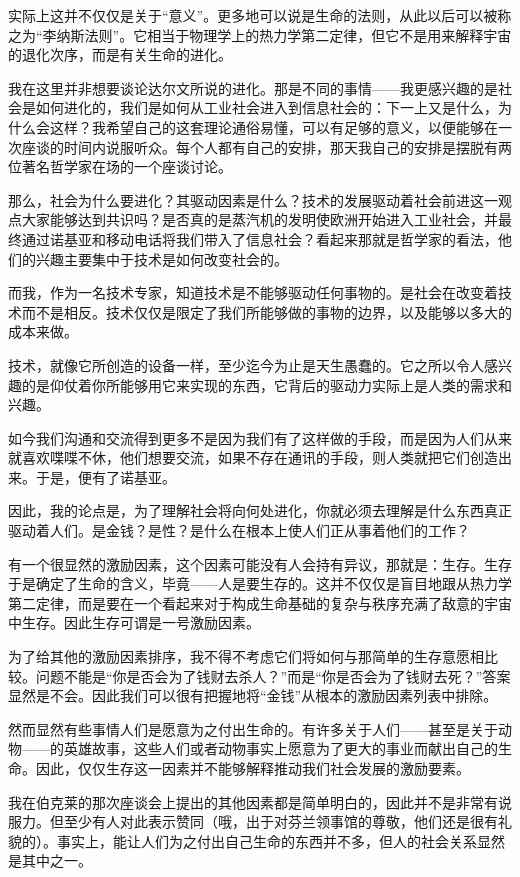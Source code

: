 实际上这并不仅仅是关于“意义”。更多地可以说是生命的法则，从此以后可以被称之为“李纳斯法则”。它相当于物理学上的热力学第二定律，但它不是用来解释宇宙的退化次序，而是有关生命的进化。

我在这里并非想要谈论达尔文所说的进化。那是不同的事情——我更感兴趣的是社会是如何进化的，我们是如何从工业社会进入到信息社会的：下一上又是什么，为什么会这样？我希望自己的这套理论通俗易懂，可以有足够的意义，以便能够在一次座谈的时间内说服听众。每个人都有自己的安排，那天我自己的安排是摆脱有两位著名哲学家在场的一个座谈讨论。

那么，社会为什么要进化？其驱动因素是什么？技术的发展驱动着社会前进这一观点大家能够达到共识吗？是否真的是蒸汽机的发明使欧洲开始进入工业社会，并最终通过诺基亚和移动电话将我们带入了信息社会？看起来那就是哲学家的看法，他们的兴趣主要集中于技术是如何改变社会的。

而我，作为一名技术专家，知道技术是不能够驱动任何事物的。是社会在改变着技术而不是相反。技术仅仅是限定了我们所能够做的事物的边界，以及能够以多大的成本来做。

技术，就像它所创造的设备一样，至少迄今为止是天生愚蠢的。它之所以令人感兴趣的是仰仗着你所能够用它来实现的东西，它背后的驱动力实际上是人类的需求和兴趣。

如今我们沟通和交流得到更多不是因为我们有了这样做的手段，而是因为人们从来就喜欢喋喋不休，他们想要交流，如果不存在通讯的手段，则人类就把它们创造出来。于是，便有了诺基亚。

因此，我的论点是，为了理解社会将向何处进化，你就必须去理解是什么东西真正驱动着人们。是金钱？是性？是什么在根本上使人们正从事着他们的工作？

有一个很显然的激励因素，这个因素可能没有人会持有异议，那就是：生存。生存于是确定了生命的含义，毕竟——人是要生存的。这并不仅仅是盲目地跟从热力学第二定律，而是要在一个看起来对于构成生命基础的复杂与秩序充满了敌意的宇宙中生存。因此生存可谓是一号激励因素。

为了给其他的激励因素排序，我不得不考虑它们将如何与那简单的生存意愿相比较。问题不能是“你是否会为了钱财去杀人？”而是“你是否会为了钱财去死？”答案显然是不会。因此我们可以很有把握地将“金钱”从根本的激励因素列表中排除。

然而显然有些事情人们是愿意为之付出生命的。有许多关于人们——甚至是关于动物——的英雄故事，这些人们或者动物事实上愿意为了更大的事业而献出自己的生命。因此，仅仅生存这一因素并不能够解释推动我们社会发展的激励要素。

我在伯克莱的那次座谈会上提出的其他因素都是简单明白的，因此并不是非常有说服力。但至少有人对此表示赞同（哦，出于对芬兰领事馆的尊敬，他们还是很有礼貌的）。事实上，能让人们为之付出自己生命的东西并不多，但人的社会关系显然是其中之一。


